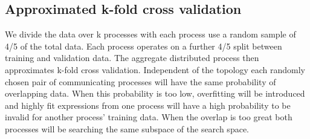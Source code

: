 \subsection{Approximated k-fold cross validation}
We divide the data over k processes with each process use a random sample of 4/5 of the total data. Each process operates on a further 4/5 split between training and validation data. The aggregate distributed process then approximates k-fold cross validation. Independent of the topology each randomly chosen pair of communicating processes will have the same probability of overlapping data. When this probability is too low, overfitting will be introduced and highly fit expressions from one process will have a high probability to be invalid for another process' training data. When the overlap is too great both processes will be searching the same subspace of the search space.
%
%
